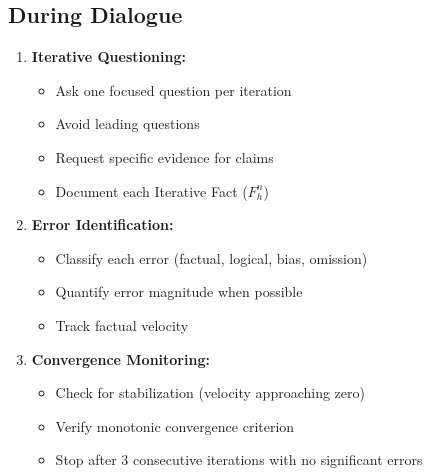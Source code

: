 \documentclass[11pt,a4paper]{article}
\begin{document}
\subsection*{During Dialogue}
\begin{enumerate}[leftmargin=*, resume]
    \item \textbf{Iterative Questioning:}
    \begin{itemize}[nosep]
        \item Ask one focused question per iteration
        \item Avoid leading questions
        \item Request specific evidence for claims
        \item Document each Iterative Fact ($F_h^n$)
    \end{itemize}
    
    \item \textbf{Error Identification:}
    \begin{itemize}[nosep]
        \item Classify each error (factual, logical, bias, omission)
        \item Quantify error magnitude when possible
        \item Track factual velocity
    \end{itemize}
    
    \item \textbf{Convergence Monitoring:}
    \begin{itemize}[nosep]
        \item Check for stabilization (velocity approaching zero)
        \item Verify monotonic convergence criterion
        \item Stop after 3 consecutive iterations with no significant errors
    \end{itemize}
\end{enumerate}
\end{document}
